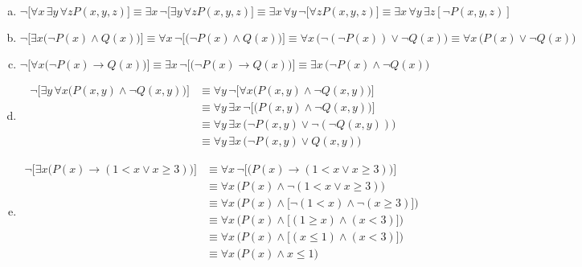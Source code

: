 \documentclass[11pt,letterpaper]{article}
\begin{document}
\sol 
\begin{enumerate}[(a)]
\item 
	\[
	\neg \big[ \forall x\, \exists y\, \forall z P(x, y, z) \big] \equiv \exists x\, \neg \big[ \exists y\, \forall z P(x, y, z) \big] \equiv \exists x\, \forall y\, \neg \big[ \forall z P(x, y, z) \big] \equiv \exists x\, \forall y\, \exists z [ \neg P(x, y, z) ]
	\] \pspace

\item 
	\[
	\neg \big[ \exists x \big( \neg P(x) \wedge Q(x) \big) \big] \equiv \forall x\, \neg \big[ \big( \neg P(x) \wedge Q(x) \big) \big] \equiv \forall x\, \big( \neg (\neg P(x) ) \vee \neg Q(x) \big) \equiv \forall x\, \big( P(x) \vee \neg Q(x) \big)
	\] \pspace

\item 
	\[
	\neg \big[ \forall x \big( \neg P(x) \to Q(x) \big) \big] \equiv \exists x\, \neg \big[ \big( \neg P(x) \to Q(x) \big) \big] \equiv \exists x\, \big( \neg P(x) \wedge \neg Q(x) \big)
	\] \pspace

\item 
	\[
	\begin{aligned}
	\neg \big[ \exists y\, \forall x \big( P(x, y) \wedge \neg Q(x, y) \big) \big] &\equiv \forall y\, \neg \big[ \forall x \big( P(x, y) \wedge \neg Q(x, y) \big) \big] \\
	&\equiv \forall y\, \exists x\, \neg \big[ \big( P(x, y) \wedge \neg Q(x, y) \big) \big] \\
	&\equiv \forall y\, \exists x\, \big( \neg P(x, y) \vee \neg ( \neg Q(x, y) ) \big) \\
	&\equiv \forall y\, \exists x\, \big( \neg P(x, y) \vee Q(x, y) \big) 
	\end{aligned}
	\]

\item 
	\[
	\begin{aligned}
	\neg \big[ \exists x \big( P(x) \to (1 < x \vee x \geq 3) \big) \big] &\equiv \forall x\, \neg \big[ \big( P(x) \to (1 < x \vee x \geq 3) \big) \big] \\
	&\equiv \forall x\,  \big( P(x) \wedge \neg (1 < x \vee x \geq 3) \big) \\
	&\equiv \forall x\,  \big( P(x) \wedge  \big[ \neg (1 < x) \wedge \neg (x \geq 3) \big] \big) \\
	&\equiv \forall x\,  \big( P(x) \wedge  \big[ (1 \geq x) \wedge (x < 3) \big] \big) \\
	&\equiv \forall x\,  \big( P(x) \wedge  \big[ (x \leq 1) \wedge (x < 3) \big] \big) \\
	&\equiv \forall x\,  \big( P(x) \wedge  x \leq 1 \big)
	\end{aligned}
	\]
\end{enumerate}
\end{document}
